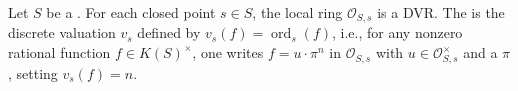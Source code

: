 \begin{definition} \label{definition:p_adic_valuation_of_a_point_of_a_dedekind_scheme}
    Let $S$ be a . For each closed point $s \in S$, the local ring $\mathcal{O}_{S,s}$ is a DVR. The  is the discrete valuation $v_s$ defined by $v_s(f) = \operatorname{ord}_s(f)$, i.e., for any nonzero rational function $f \in K(S)^\times$, one writes $f = u \cdot \pi^n$ in $\mathcal{O}_{S,s}$ with $u \in \mathcal{O}_{S,s}^\times$ and a  $\pi$, setting $v_s(f) = n$.
\end{definition}